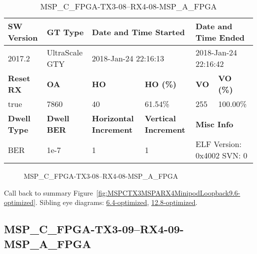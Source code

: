 \begin{table}[h]
\centering
\caption{MSP\_C\_FPGA-TX3-08--RX4-08-MSP\_A\_FPGA}
\label{tab:MSPCFPGATX308RX408MSPAFPGA9.6-optimized}
\begin{tabular}{@{}|l|l|l|l|l|l|@{}}
\toprule
\textbf{SW Version}                & \textbf{GT Type}   & \multicolumn{2}{l|}{\textbf{Date and Time Started}}            & \multicolumn{2}{l|}{\textbf{Date and Time Ended}}        \\ \midrule
2017.2                       & UltraScale GTY          & \multicolumn{2}{l|}{2018-Jan-24 22:16:13}                   & \multicolumn{2}{l|}{2018-Jan-24 22:16:42}               \\ \midrule
\textbf{Reset RX}                  & \textbf{OA} & \textbf{HO}   & \textbf{HO (\%)} & \textbf{VO} & \textbf{VO (\%)} \\ \midrule
true & 7860        & 40          & 61.54\%        & 255        & 100.00\%       \\ \midrule
\textbf{Dwell Type}                & \textbf{Dwell BER} & \textbf{Horizontal Increment} & \textbf{Vertical Increment}    & \multicolumn{2}{l|}{\textbf{Misc Info}}                  \\ \midrule
BER                            & 1e-7        & 1        & 1           & \multicolumn{2}{l|}{ELF Version: 0x4002 SVN: 0}                         \\ \bottomrule
\end{tabular}
\end{table}

\begin{figure}[h]
\caption{MSP\_C\_FPGA-TX3-08--RX4-08-MSP\_A\_FPGA} \label{fig:MSPCFPGATX308RX408MSPAFPGA9.6-optimized}
\end{figure}

Call back to summary Figure~\ref{fig:MSPCTX3MSPARX4MinipodLoopback9.6-optimized}.
Sibling eye diagrams: \hyperref[sec:MSPCFPGATX308RX408MSPAFPGA6.4-optimized]{6.4-optimized}, \hyperref[sec:MSPCFPGATX308RX408MSPAFPGA12.8-optimized]{12.8-optimized}.

\clearpage
\newpage


\subsection{MSP\_C\_FPGA-TX3-09--RX4-09-MSP\_A\_FPGA}\label{sec:MSPCFPGATX309RX409MSPAFPGA9.6-optimized}

